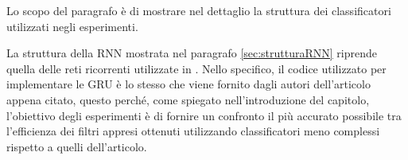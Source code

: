 \documentclass[../../main.tex]{subfiles}
\begin{document}
    Lo scopo del paragrafo è di mostrare nel dettaglio la struttura dei classificatori utilizzati negli esperimenti. 
    
    La struttura della RNN mostrata nel paragrafo \ref{sec:strutturaRNN} riprende quella delle reti ricorrenti utilizzate in \cite{ma2020}. Nello specifico, il codice utilizzato per implementare le GRU è lo stesso che viene fornito dagli autori dell'articolo appena citato, questo perché, come spiegato nell'introduzione del capitolo, l'obiettivo degli esperimenti è di fornire un confronto il più accurato possibile tra l'efficienza dei  filtri appresi ottenuti utilizzando classificatori meno complessi rispetto a quelli dell'articolo. 
\end{document}
